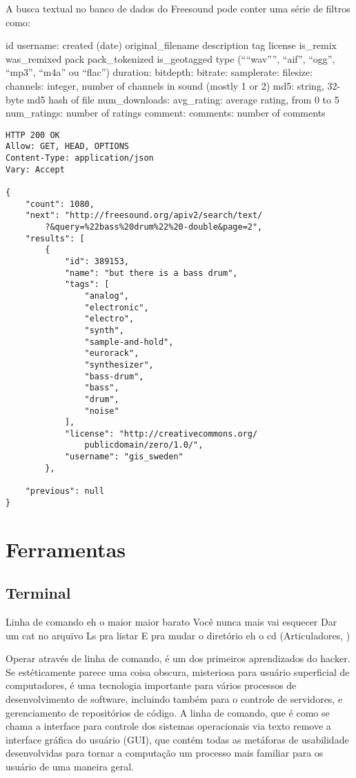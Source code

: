 A busca textual no banco de dados do Freesound pode conter uma série de filtros como:

id  
username:   
created (date)
original\_filename
description
tag
license
is\_remix
was\_remixed
pack
pack\_tokenized
is\_geotagged
type (“``wav”'', ``aif'', ``ogg'', ``mp3'', ``m4a'' ou ``flac'')
duration:   
bitdepth:   
bitrate:    
samplerate: 
filesize:   
channels:   integer, number of channels in sound (mostly 1 or 2)
md5:    string, 32-byte md5 hash of file
num\_downloads: 
avg\_rating:     average rating, from 0 to 5
num\_ratings: number of ratings
comment:    
comments:   number of comments

\begin{verbatim}
HTTP 200 OK
Allow: GET, HEAD, OPTIONS
Content-Type: application/json
Vary: Accept

{
    "count": 1080,
    "next": "http://freesound.org/apiv2/search/text/
        ?&query=%22bass%20drum%22%20-double&page=2",
    "results": [
        {
            "id": 389153,
            "name": "but there is a bass drum",
            "tags": [
                "analog",
                "electronic",
                "electro",
                "synth",
                "sample-and-hold",
                "eurorack",
                "synthesizer",
                "bass-drum",
                "bass",
                "drum",
                "noise"
            ],
            "license": "http://creativecommons.org/
                publicdomain/zero/1.0/",
            "username": "gis_sweden"
        },
        
    "previous": null
}

\end{verbatim}



\section{Ferramentas}
\subsection{Terminal}

\begin{citacao}
Linha de comando eh o maior maior barato
Você nunca mais vai esquecer
Dar um cat no arquivo
Ls pra listar
E pra mudar o diretório eh o cd (Articuladores, )
\end{citacao}

Operar através de linha de comando, é um dos primeiros aprendizados do hacker. Se estéticamente parece uma coisa obscura, misteriosa para usuário superficial de computadores, é uma tecnologia importante para vários processos de desenvolvimento de software, incluindo também para o controle de servidores, e gerenciamento de repositórios de código. A linha de comando, que é como se chama a interface para controle dos sistemas operacionais via texto remove a interface gráfica do usuário (GUI), que contém todas as metáforas de usabilidade desenvolvidas para tornar a computação um processo mais familiar para os usuário de uma maneira geral.

